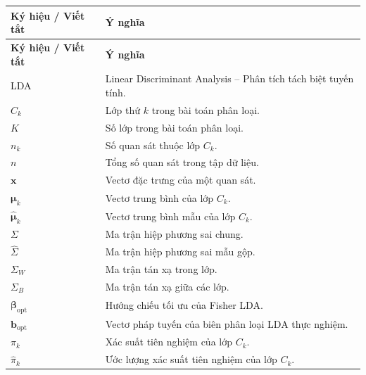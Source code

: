 \documentclass[12pt,a4paper,oneside]{report}
\begin{document}

\vspace{0.8cm}


\begin{longtable}{p{3cm}p{10cm}}
	\textbf{Ký hiệu / Viết tắt} & \textbf{Ý nghĩa} \\
	\hline
	\endfirsthead
	
	\textbf{Ký hiệu / Viết tắt} & \textbf{Ý nghĩa} \\
	\hline
	\endhead
	
LDA & Linear Discriminant Analysis -- Phân tích tách biệt tuyến tính. \\[0.2cm]

$C_k$ & Lớp thứ $k$ trong bài toán phân loại. \\[0.2cm]
$K$ & Số lớp trong bài toán phân loại. \\[0.2cm]
$n_k$ & Số quan sát thuộc lớp $C_k$. \\[0.2cm]
$n$ & Tổng số quan sát trong tập dữ liệu. \\[0.2cm]

$\bm{x}$ & Vectơ đặc trưng của một quan sát. \\[0.2cm]
$\bm{\mu}_k$ & Vectơ trung bình của lớp $C_k$. \\[0.2cm]
$\hat{\bm{\mu}}_k$ & Vectơ trung bình mẫu của lớp $C_k$. \\[0.2cm]

$\Sigma$ & Ma trận hiệp phương sai chung. \\[0.2cm]
$\hat{\Sigma}$ & Ma trận hiệp phương sai mẫu gộp. \\[0.2cm]

$\Sigma_W$ & Ma trận tán xạ trong lớp. \\[0.2cm]
$\Sigma_B$ & Ma trận tán xạ giữa các lớp. \\[0.2cm]

$\bm{\beta}_{\text{opt}}$ & Hướng chiếu tối ưu của Fisher LDA. \\[0.2cm]
$\bm{b}_{\text{opt}}$ & Vectơ pháp tuyến của biên phân loại LDA thực nghiệm. \\[0.2cm]

$\pi_k$ & Xác suất tiên nghiệm của lớp $C_k$. \\[0.2cm]
$\hat{\pi}_k$ & Ước lượng xác suất tiên nghiệm của lớp $C_k$. \\[0.2cm]


\end{longtable}
\end{document}
